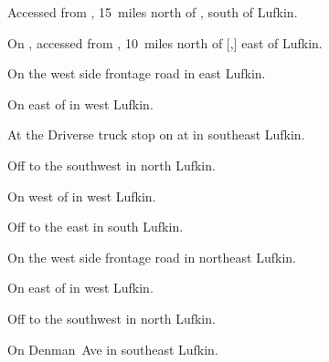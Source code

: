
\begin{LocationList}

Accessed from , 15~miles north of , south of Lufkin.

On , accessed from , 10~miles north of [,] east of Lufkin.

\Location{\GarageHQ \Garage}
On the west side   frontage road in east Lufkin.

On  east of  in west Lufkin.

At the Driverse truck stop on  at  in southeast Lufkin.

Off   to the southwest in north Lufkin.

On  west of  in west Lufkin.

Off  to the east in south Lufkin.

\Location{\TruckService \Service}
On the west side   frontage road in northeast Lufkin.

On  east of  in west Lufkin.

Off   to the southwest in north Lufkin.

On  Denman~Ave in southeast Lufkin.

\end{LocationList}
